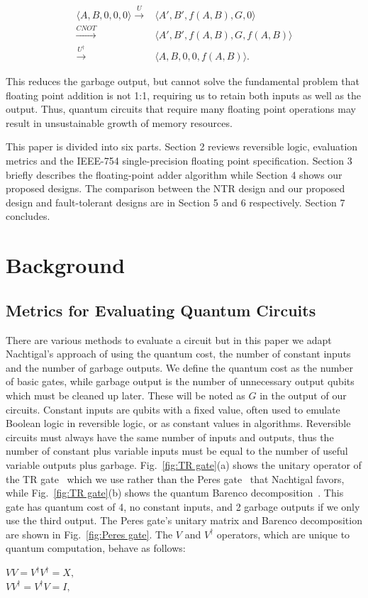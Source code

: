 \documentclass[%
reprint,
 amsmath,amssymb,
 aps,
]{revtex4-1}
\begin{document}
\begin{align}
   \langle A,B,0,0,0 \rangle \xrightarrow{U} & \langle A',B',f(A,B),G,0 \rangle \\\nonumber
   \xrightarrow{CNOT} & \langle A',B',f(A,B),G,f(A,B) \rangle  \\\nonumber
   \xrightarrow{U^\dag} & \langle A,B,0,0,f(A,B) \rangle . 
\label{eqn:Benett}
\end{align}


\par This reduces the garbage output, but cannot solve the fundamental problem that floating point addition is not 1:1, requiring us to retain both inputs as well as the output. Thus, quantum circuits that require many floating point operations may result in unsustainable growth of memory resources.  

\par This paper is divided into six parts. Section 2 reviews reversible logic, evaluation metrics and the IEEE-754 single-precision floating point specification. Section 3 briefly describes the floating-point adder algorithm while Section 4 shows our proposed designs. The comparison between the NTR design and our proposed design and fault-tolerant designs are in Section 5 and 6 respectively. Section 7 concludes. 

\section{Background}

\subsection{Metrics for Evaluating Quantum Circuits}

There are various methods to evaluate a circuit but in this paper we adapt Nachtigal's approach of using the quantum cost, the number of constant inputs and the number of garbage outputs. We define the quantum cost as the number of basic gates, while garbage output is the number of unnecessary output qubits which must be cleaned up later. These will be noted as $G$ in the output of our circuits. Constant inputs are qubits with a fixed value, often used to emulate Boolean logic in reversible logic, or as constant values in algorithms. Reversible circuits must always have the same number of inputs and outputs, thus the number of constant plus variable inputs must be equal to the number of useful variable outputs plus garbage. Fig.~\ref{fig:TR gate}(a) shows the unitary operator of the TR gate~\cite{efficient-subtractor} which we use rather than the Peres gate~\cite{peres} that Nachtigal favors, while Fig.~\ref{fig:TR gate}(b) shows the quantum Barenco decomposition~\cite{barenco}. This gate has quantum cost of 4, no constant inputs, and 2 garbage outputs if we only use the third output. The Peres gate's unitary matrix and Barenco decomposition are shown in Fig.~\ref{fig:Peres gate}. The $V$ and $V^{\dag}$ operators, which are unique to quantum computation, behave as follows:
\begin{center}
$
VV=V^{\dag}V^{\dag}=X, 
$
\\
$
VV^{\dag}=V^{\dag}V=I,
$
\end{center}
\end{document}
